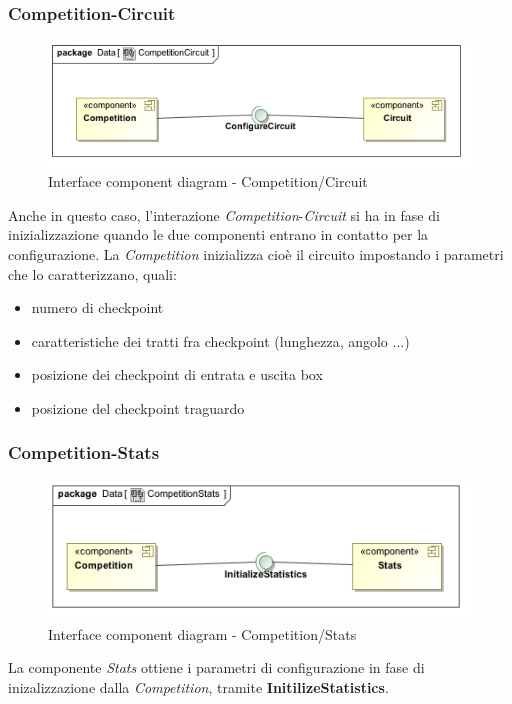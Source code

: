 \subsubsection{Competition-Circuit}
\begin{center}
\begin{figure}[h!]
	\includegraphics[scale=0.55]{img/InteractionDiagram/Implementation_Diagram__CompetitionCircuit.jpg}
\caption{Interface component diagram - Competition/Circuit}
\end{figure}
\end{center}
Anche in questo caso, l'interazione \emph{Competition}-\emph{Circuit} si ha in fase di inizializzazione quando le due componenti entrano in contatto
per la configurazione. La \emph{Competition} inizializza cio\`{e} il circuito impostando i parametri che lo caratterizzano, quali:
	\begin{itemize}
		\item numero di checkpoint
		\item caratteristiche dei tratti fra checkpoint (lunghezza, angolo ...)
		\item posizione dei checkpoint di entrata e uscita box
		\item posizione del checkpoint traguardo
	\end{itemize}
\subsubsection{Competition-Stats}
\begin{center}
\begin{figure}[h!]
	\includegraphics[scale=0.55]{img/InteractionDiagram/Implementation_Diagram__CompetitionStats.jpg}
\caption{Interface component diagram - Competition/Stats}
\end{figure}
\end{center}
La componente \emph{Stats} ottiene i parametri di configurazione in fase di inizalizzazione dalla \emph{Competition}, tramite
\textbf{InitilizeStatistics}.
